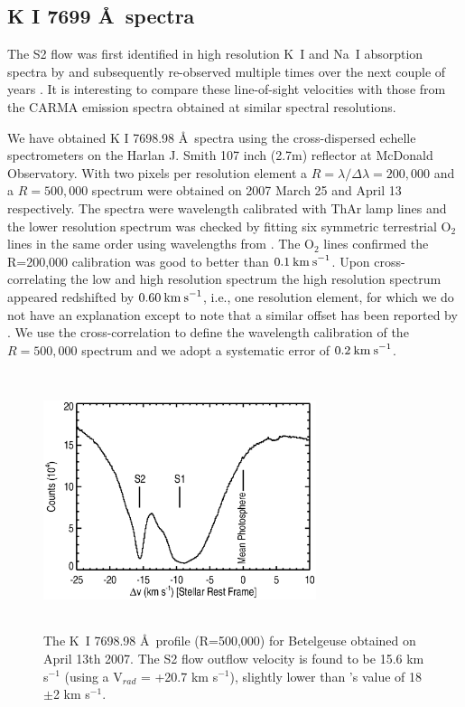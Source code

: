 \documentclass[iop]{emulateapj}
\begin{document}
\subsection{K I 7699 \AA \ spectra}

The S2 flow was first identified in high resolution K~I and Na~I absorption spectra by \cite{1975ApJ...199..427G} and subsequently re-observed multiple times over the next couple of years \citep{1979QJRAS..20..361G}. It is interesting to compare these line-of-sight velocities with those from the CARMA emission spectra obtained at similar spectral resolutions.

We have obtained K I 7698.98 \AA \ spectra using the cross-dispersed echelle spectrometers on the Harlan J. Smith 107 inch (2.7m) reflector at McDonald Observatory. With two pixels per resolution element a $R=\lambda/\Delta\lambda=200,000$ and a $R=500,000$ spectrum were obtained on 2007 March 25 and April 13 respectively. The spectra were wavelength calibrated with ThAr lamp lines and the lower resolution spectrum was checked by fitting six symmetric terrestrial O${}_2$ lines in the same order using wavelengths from \cite{1948ApJ...108..167B}. The O${}_2$ lines confirmed the R=200,000 calibration was good to better than $0.1\>{\rm km\>s}^{-1}$. Upon cross-correlating the low and high resolution spectrum the high resolution spectrum appeared redshifted by $0.60\>{\rm km\>s}^{-1}$, i.e., one resolution element, for which we do not have an explanation except to note that a similar offset has been reported by \cite{1994ApJ...436..152W}. We use the cross-correlation to define the wavelength calibration of the $R=500,000$ spectrum and we adopt a systematic error of $0.2\>{\rm km\>s}^{-1}$.

\begin{figure}
\includegraphics[trim=40pt 0pt 50pt 0pt, width=8.0cm, height=7.5cm]{f18.eps}
\caption{The K~I 7698.98 \AA \  profile (R=500,000) for Betelgeuse obtained on April 13th 2007. The S2 flow outflow velocity is found to be 15.6 km s${}^{-1}$ (using a V$_{rad}$ = +20.7 km s${}^{-1}$), slightly lower than \citeauthor{2002A&A...386.1009P}'s \citeyearpar{2002A&A...386.1009P} value of 18$\pm$2 km s${}^{-1}$.}
\label{fig:fig7}
\end{figure}
\end{document}
